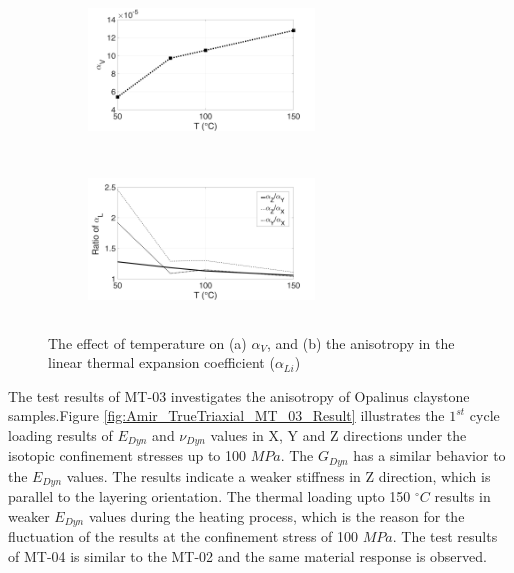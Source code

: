 \begin{figure}[!ht]
\centering
\begin{subfigure}[c]{0.48\textwidth}
\centering
\includegraphics[width=6cm,height=4cm]{figures/Amir_TrueTriaxial_MT_02_Result_1a.png}
\subcaption{}
\label{fig:Amir_TrueTriaxial_MT_02_Result_1a}
\end{subfigure}
\hfill
\begin{subfigure}[c]{0.48\textwidth}
\centering
\includegraphics[width=6cm,height=4cm]{figures/Amir_TrueTriaxial_MT_02_Result_1b.png}
\subcaption{}
\label{fig:Amir_TrueTriaxial_MT_02_Result_1b}
\end{subfigure}
\caption{The effect of temperature on (a) $\alpha_V$, and (b) the anisotropy in the linear thermal expansion coefficient ($\alpha_{Li}$)}
\end{figure}

The test results of MT-03 investigates the anisotropy of Opalinus claystone samples.Figure \ref{fig:Amir_TrueTriaxial_MT_03_Result} illustrates the $1^{st}$ cycle loading results of $E_{Dyn}$ and $\nu_{Dyn}$ values in X, Y and Z directions under the isotopic confinement stresses up to 100 $MPa$. The $G_{Dyn}$ has a similar behavior to the $E_{Dyn}$ values. The results indicate a weaker stiffness in Z direction, which is parallel to the layering orientation. The thermal loading upto 150 $^{\circ}C$ results in weaker $E_{Dyn}$ values during the heating process, which is the reason for the fluctuation of the results at the confinement stress of 100 $MPa$. The test results of MT-04 is similar to the MT-02 and the same material response is observed. 

